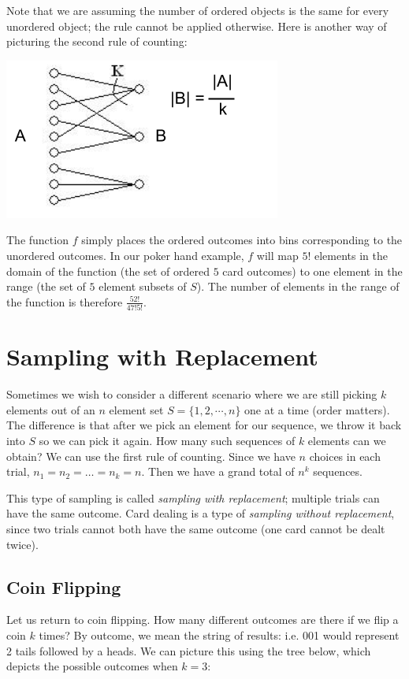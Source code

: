 \documentclass[11pt,fleqn]{article}
\begin{document}
Note that we are assuming the number of ordered objects is the same for every 
unordered object; the rule cannot be applied otherwise.  Here is another way of 
picturing the second rule of counting:

\begin{center}
\includegraphics[scale=.6]{counting2.png}
\end{center}

The function $f$ simply places the ordered outcomes into bins corresponding to the unordered outcomes. 
In our poker hand example, $f$ will map $5!$ elements in the domain of the function (the set of ordered $5$ card outcomes)
to one element in the range (the set of $5$ element subsets of $S$). 
The number of elements in the range of the function is therefore $\frac{52!}{47!5!}$. 



\section*{Sampling with Replacement}

Sometimes we wish to consider a different scenario where we are still picking $k$ elements out of 
an $n$ element set $S = \{1,2,\cdots,n\}$ one at a time (order matters). The difference is that after we pick an element
for our sequence, we throw it back into $S$ so we can pick it again. 
How many such sequences of 
$k$ elements can we obtain? We can use the first rule of counting. Since we have $n$ choices
in each trial, $n_1 = n_2 = \ldots = n _k = n$. Then we have a grand total of $n^k$ sequences. 

This type of sampling is called {\it sampling with replacement}; 
multiple trials can have the same outcome.
Card dealing is a type of {\it sampling without replacement}, since two trials cannot both have
the same outcome (one card cannot be dealt twice). 

\subsection*{Coin Flipping}
Let us return to coin flipping. How many different outcomes are there if we flip a coin $k$ times? By outcome, 
we mean the string of results: i.e. 001 would represent
2 tails followed by a heads. We can picture this using the tree below, which depicts the possible outcomes when $k = 3$:
\end{document}
